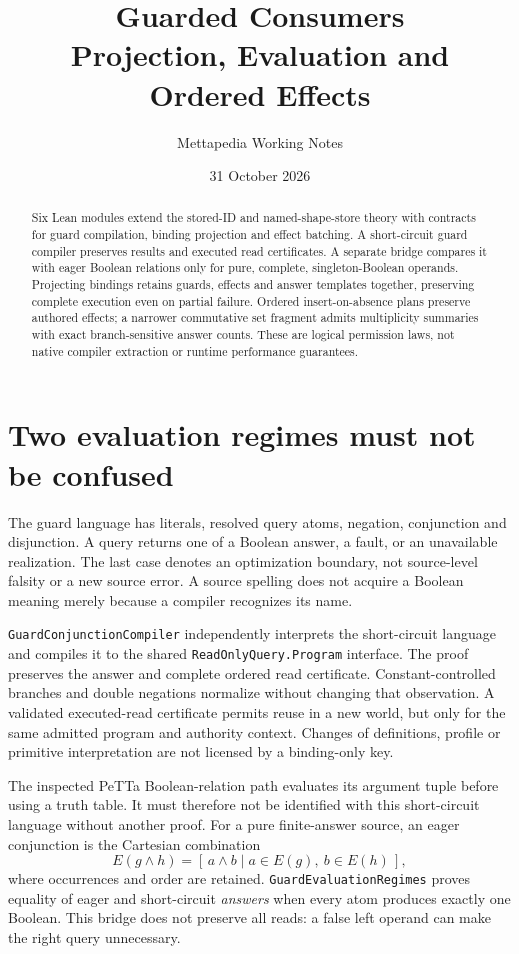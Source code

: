 \documentclass[11pt,a4paper]{article}
\title{Guarded Consumers\\
  \large Projection, Evaluation and Ordered Effects}
\author{Mettapedia Working Notes}
\date{31 October 2026}
\newcommand{\code}[1]{\nolinkurl{#1}}
\begin{document}
\maketitle

\begin{abstract}
Six Lean modules extend the stored-ID and named-shape-store theory with
contracts for guard compilation, binding projection and effect batching.
A short-circuit guard compiler preserves results and executed read certificates.
A separate bridge compares it with eager Boolean relations only for pure,
complete, singleton-Boolean operands. Projecting bindings retains guards,
effects and answer templates together, preserving complete execution even on
partial failure. Ordered insert-on-absence plans preserve authored effects;
a narrower commutative set fragment admits multiplicity summaries with exact
branch-sensitive answer counts. These are logical permission laws, not native
compiler extraction or runtime performance guarantees.
\end{abstract}

\section{Two evaluation regimes must not be confused}

The guard language has literals, resolved query atoms, negation, conjunction
and disjunction. A query returns one of a Boolean answer, a fault, or an
unavailable realization. The last case denotes an optimization boundary, not
source-level falsity or a new source error. A source spelling does not acquire
a Boolean meaning merely because a compiler recognizes its name.

\code{GuardConjunctionCompiler} independently interprets the short-circuit
language and compiles it to the shared \code{ReadOnlyQuery.Program} interface.
The proof preserves the answer and complete ordered read certificate.
Constant-controlled branches and double negations normalize without changing
that observation. A validated executed-read certificate permits reuse in a
new world, but only for the same admitted program and authority context.
Changes of definitions, profile or primitive interpretation are not licensed
by a binding-only key.

The inspected PeTTa Boolean-relation path evaluates its argument tuple before
using a truth table. It must therefore not be identified with this
short-circuit language without another proof. For a pure finite-answer source,
an eager conjunction is the Cartesian combination
\[
 E(g\mathbin{\wedge}h)
   = [\,a\mathbin{\wedge}b\mid a\in E(g),\ b\in E(h)\,],
\]
where occurrences and order are retained. \code{GuardEvaluationRegimes}
proves equality of eager and short-circuit \emph{answers} when every atom
produces exactly one Boolean. This bridge does not preserve all reads: a
false left operand can make the right query unnecessary.
\end{document}
